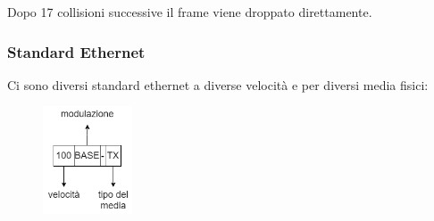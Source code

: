 Dopo 17 collisioni successive il frame viene droppato direttamente.

\subsubsection{Standard Ethernet}
Ci sono diversi standard ethernet a diverse velocità e per diversi media fisici:
\begin{figure}[H]
    \centering
    \includegraphics[width=100px]{images/3_Reti_connessione_diretta/standard_ethernet.png}
\end{figure}
